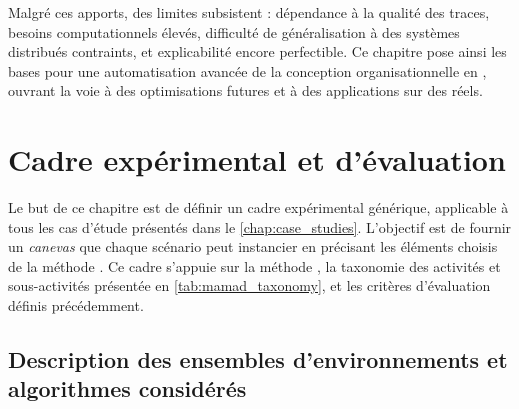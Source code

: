 Malgré ces apports, des limites subsistent : dépendance à la qualité des traces, besoins computationnels élevés, difficulté de généralisation à des systèmes distribués contraints, et explicabilité encore perfectible. Ce chapitre pose ainsi les bases pour une automatisation avancée de la conception organisationnelle en , ouvrant la voie à des optimisations futures et à des applications sur des  réels.


\clearpage
\thispagestyle{empty}
\null
\newpage


\chapter{Cadre expérimental et d'évaluation}
\label{chap:cadre_experimental}

Le but de ce chapitre est de définir un cadre expérimental générique, applicable à tous les cas d'étude présentés dans le \autoref{chap:case_studies}. L'objectif est de fournir un \textit{canevas} que chaque scénario peut instancier en précisant les éléments choisis de la méthode . Ce cadre s'appuie sur la méthode , la taxonomie des activités et sous-activités présentée en \autoref{tab:mamad_taxonomy}, et les critères d'évaluation définis précédemment.

\section{Description des ensembles d'environnements et algorithmes considérés}

